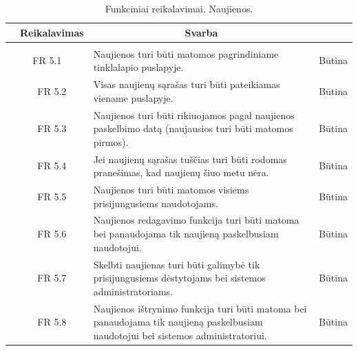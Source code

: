 \documentclass{VUMIFPSkursinis}
\begin{document}
\begin{table}[H]
	\caption{Funkciniai reikalavimai. Naujienos.}
	\begin{tabular}{|p{1cm}|p{1cm}|p{}|p{}|}
		\hline 
		\rowcolor{gray!50}
		\multicolumn{2}{|c|}{{\bfseries Kodas}}&
		\multicolumn{1}{c|}{{\bfseries Reikalavimas}}&
		\multicolumn{1}{c|}{{\bfseries Svarba}}\\
		\hline
		\rowcolor{lightgray}
		\multicolumn{4}{|c|}{Naujienos}\\		
		
		\hline
		\multicolumn{2}{|c|}{FR 5.1}&
		{Naujienos turi būti matomos pagrindiniame tinklalapio puslapyje.
		}&		
		\multicolumn{1}{c|}{Būtina}\\
		\hline
		\multicolumn{1}{|c}{}&
		\multicolumn{1}{c|}{FR 5.2}&
		{Visas naujienų sąrašas turi būti pateikiamas viename puslapyje.
		}&		
		\multicolumn{1}{c|}{Būtina}\\
		\hline
		\multicolumn{1}{|c}{}&
		\multicolumn{1}{c|}{FR 5.3}&
		{Naujienos turi būti rikiuojamos pagal naujienos paskelbimo datą (naujausios turi būti matomos pirmos).
		}&
		\multicolumn{1}{c|}{Būtina}\\	
		\hline		
		\multicolumn{1}{|c}{}&
		\multicolumn{1}{c|}{FR 5.4}&
		{Jei naujienų sąrašas tuščias turi būti rodomas pranešimas, kad naujienų šiuo metu nėra.
		}&
		\multicolumn{1}{c|}{Būtina}\\									
		\hline
		\multicolumn{1}{|c}{}&
		\multicolumn{1}{c|}{FR 5.5}&
		{Naujienos turi būti matomos visiems prisijungusiems naudotojams.
		}&
		\multicolumn{1}{c|}{Būtina}\\	
		\hline		
		\multicolumn{1}{|c}{}&
		\multicolumn{1}{c|}{FR 5.6}&
		{Naujienos redagavimo funkcija turi būti matoma bei panaudojama tik naujieną paskelbusiam naudotojui.
		}&
		\multicolumn{1}{c|}{Būtina}\\									
		\hline
		\multicolumn{1}{|c}{}&
		\multicolumn{1}{c|}{FR 5.7}&
		{Skelbti naujienas turi būti galimybė tik prisijungusiems dėstytojams bei sistemos administratoriams.
		}&
		\multicolumn{1}{c|}{Būtina}\\	
		\hline		
		\multicolumn{1}{|c}{}&
		\multicolumn{1}{c|}{FR 5.8}&
		{Naujienos ištrynimo funkcija turi būti matoma bei panaudojama tik naujieną paskelbusiam naudotojui bei sistemos administratoriui.
		}&
		\multicolumn{1}{c|}{Būtina}\\									
		\hline
	\end{tabular}		
\end{table}
\end{document}
